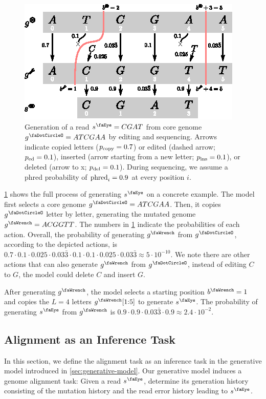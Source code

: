 \begin{figure}
	\centering
	\includegraphics[width=0.99\linewidth]{figures/edit-example}
	\caption{Generation of a read $\segment^\gread=CGAT$ from core genome $\genome^\gcore=ATCGAA$ by editing and sequencing. Arrows indicate copied letters ($p_\text{copy}=0.7$) or edited (dashed arrow; $p_\text{ed}=0.1$), inserted (arrow starting from a new letter; $p_\text{ins}=0.1$), or deleted (arrow to x; $p_\text{del}=0.1$). During sequencing, we assume a phred probability of $\text{phred}_{i} = 0.9$ at every position $i$.}
	\label{fig:alignment-full}
\end{figure}

\cref{fig:alignment-full} shows the full process of generating $\segment^\gread$ on a concrete example.
The model first selects a core genome $\genome^\gcore=ATCGAA$.
Then, it copies $\genome^\gcore$ letter by letter, generating the mutated genome $\genome^\gmut=ACGGTT$.
The numbers in \cref{fig:alignment-full} indicate the probabilities of each action.
Overall, the probability of generating $\genome^\gmut$ from $\genome^\gcore$, according to the depicted actions, is $0.7 \cdot 0.1 \cdot 0.025 \cdot 0.03\bar{3} \cdot 0.1 \cdot 0.1 \cdot 0.025 \cdot 0.03\bar{3} \approx 5 \cdot 10^{-10}$.
We note there are other actions that can also generate $\genome^\gmut$ from $\genome^\gcore$, \eg instead of editing $C$ to $G$, the model could delete $C$ and insert $G$.

After generating $\genome^\gmut$, the model selects a starting position $\startInGenome^\gmut=1$ and copies the $L=4$ letters $\genome^\gmut[1 \shortcolon 5]$ to generate $\segment^\gread$.
The probability of generating $\segment^\gread$ from $\genome^\gmut$ is $0.9 \cdot 0.9 \cdot 0.03\bar{3} \cdot 0.9 \approx 2.4 \cdot 10^{-2}$.

\subsection{Alignment as an Inference Task} \label{sec:alignment}
In this section, we define the alignment task as an inference task in the generative model introduced in \cref{sec:generative-model}.
Our generative model induces a genome alignment task: Given a read $\segment^\gread$, determine its generation history consisting of the mutation history and the read error history leading to $\segment^\gread$.

